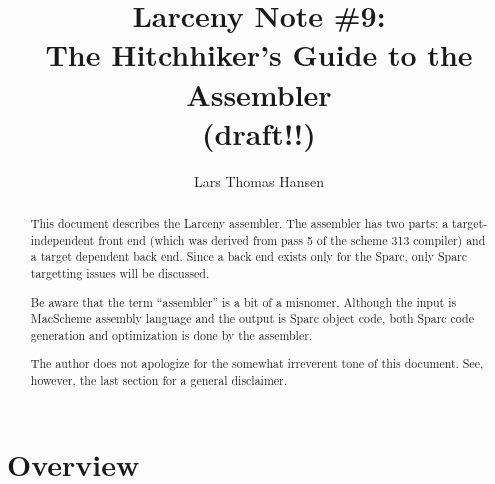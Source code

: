 %
%
%
%
% 



\title{Larceny Note \#9: \\
       The Hitchhiker's Guide to the Assembler \\
       {\tenrm (draft!!)}}
\author{Lars Thomas Hansen}


\maketitle

\begin{abstract}
This document describes the Larceny assembler. The assembler has two
parts: a target-independent front end (which was derived from pass 5
of the scheme 313 compiler) and a target dependent back end. Since a
back end exists only for the Sparc, only Sparc targetting issues will
be discussed.

Be aware that the term ``assembler'' is a bit of a misnomer. Although the
input is MacScheme assembly language and the output is Sparc object code,
both Sparc code generation and optimization is done by the assembler.

The author does not apologize for the somewhat irreverent tone of this
document. See, however, the last section for a general disclaimer.
\end{abstract}

\section{Overview}

